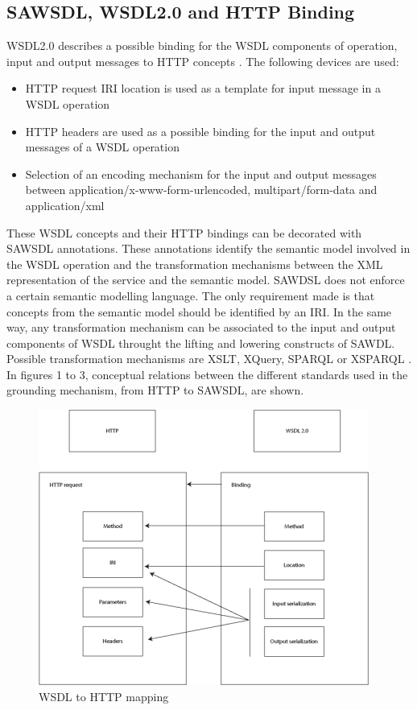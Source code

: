 \subsection{SAWSDL, WSDL2.0 and HTTP Binding}
WSDL2.0 describes a possible binding for the WSDL components of operation, input and output messages to HTTP concepts \cite{w3cwsdl2}. The following devices are used:
\begin{itemize}
  \item HTTP request IRI location is used as a template for input message in a WSDL operation
  \item HTTP headers are used as a possible binding for the input and output messages of a WSDL operation
  \item Selection of an encoding mechanism for the input and output messages between application/x-www-form-urlencoded, multipart/form-data and application/xml
\end{itemize}
These WSDL concepts and their HTTP bindings can be decorated with SAWSDL annotations. These annotations identify the semantic model involved in the WSDL operation and the transformation mechanisms between the XML representation of the service and the semantic model. SAWDSL does not enforce a certain semantic modelling language. The only requirement made is that concepts from the semantic model should be identified by an IRI. In the same way, any transformation mechanism can be associated to the input and output components of WSDL throught the lifting and lowering constructs of SAWDL. Possible transformation mechanisms are XSLT, XQuery, SPARQL \cite{sparql} or XSPARQL \cite{xsparql}.
In figures 1 to 3, conceptual relations between the different standards used in the grounding mechanism, from HTTP to SAWSDL, are shown.

\begin{figure}[htb!]
\centering%
\includegraphics{wasdl1.png}
\caption{WSDL to HTTP mapping}
\end{figure}


